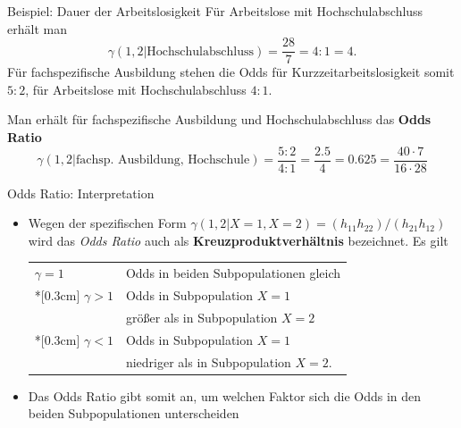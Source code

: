 \documentclass[
  10pt,
  ignorenonframetext,
]{beamer}
\begin{document}
\begin{frame}{Beispiel: Dauer der Arbeitslosigkeit}
\label{beispiel-dauer-der-arbeitslosigkeit-1}
Für Arbeitslose mit Hochschulabschluss erhält man \begin{displaymath}
\gamma(1,2|\text{Hochschulabschluss}) = \frac{28}{7} = 4:1 = 4.
\end{displaymath} Für fachspezifische Ausbildung stehen die Odds für
Kurzzeitarbeitslosigkeit somit \(5:2\), für Arbeitslose mit
Hochschulabschluss \(4:1\).

\vspace{0.5cm}

Man erhält für fachspezifische Ausbildung und Hochschulabschluss das
\textbf{Odds Ratio} \begin{displaymath}
\gamma(1,2|\text{fachsp. Ausbildung, Hochschule}) = \frac{5:2}{4:1} = \frac{2.5}{4} = 0.625 =
\frac{40\cdot 7}{16 \cdot 28}
\end{displaymath}
\end{frame}

\begin{frame}{Odds Ratio: Interpretation}
\label{odds-ratio-interpretation}
\begin{itemize}
\item
  Wegen der spezifischen Form
  \(\gamma(1,2|X=1,X=2)=(h_{11}h_{22})/(h_{21}h_{12})\) wird das
  \emph{Odds Ratio} auch als \textbf{Kreuzproduktverhältnis} bezeichnet.
  Es gilt

  \begin{center}
    \begin{tabular}{ll}
    $\gamma =1$ \hspace{1cm}& Odds in beiden Subpopulationen gleich\\*[0.3cm]
    $\gamma > 1$ & Odds in Subpopulation $X=1$ \\
    & größer als in Subpopulation $X=2$\\*[0.3cm]
    $\gamma < 1$ & Odds in Subpopulation $X=1$ \\
    & niedriger als in Subpopulation $X=2$.
    \end{tabular}
    \end{center}
    \vspace*{0.3cm}
\item
  Das Odds Ratio gibt somit an, um welchen Faktor sich die Odds in den
  beiden Subpopulationen unterscheiden
\end{itemize}
\end{frame}
\end{document}
